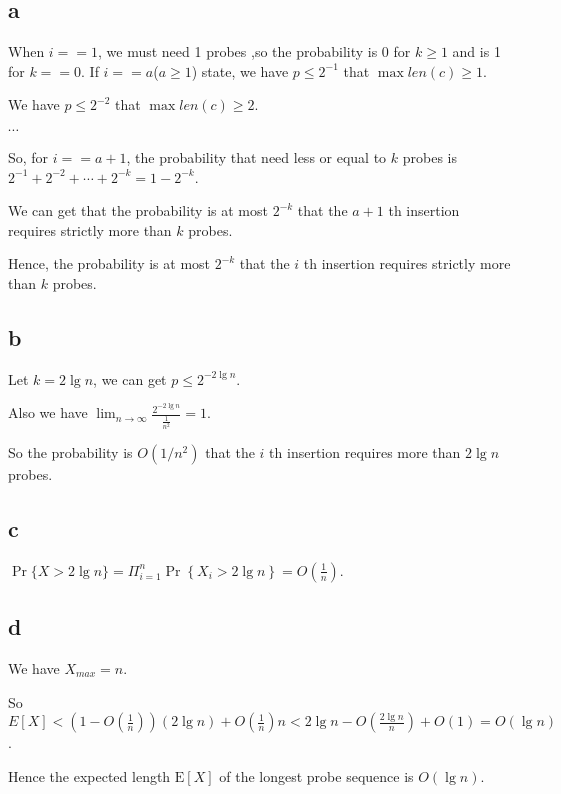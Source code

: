 \documentclass[11pt]{exam}
\begin{document}
\begin{solution}
    \subsection{a}
    When $i==1$, we must need 1 probes ,so the probability is 0 for $k \geq 1$ and is 1 for $k==0$.
    If $i==a$($a\geq 1$) state,
    we have $p\leq 2^{-1} $ that $\max len(c) \geq 1$.

    We have $p \leq 2^{-2}$ that $\max len(c) \geq 2$.

    $\cdots$

    So, for $i==a+1$,
    the probability that need less or equal to $k$ probes is $2^{-1}+2^{-2}+\cdots +2^{-k} = 1- 2^{-k}$.

    We can get that the probability is at most $2^{-k}$ that the $a+1$ th insertion requires strictly more than $k$ probes.

    Hence, the probability is at most $2^{-k}$ that the $i$ th insertion requires strictly more than $k$ probes.
    \subsection{b}
    Let $k=2 \lg n$, we can get $p \leq 2 ^{-2 \lg n}$.

    Also we have $\lim_{n \to \infty} \frac{2^{-2 \lg n}}{\frac{1}{n^2}}=1$.

    So the probability is $O\left(1 / n^{2}\right)$ that the $i$ th insertion requires more than $2 \lg n$ probes.
    \subsection{c}
    $\operatorname{Pr}\{X>2 \lg n\}=\Pi_{i=1}^{n} \operatorname{Pr}\left\{X_{i}>2 \lg n\right\} = O(\frac{1}{n}) $.

    \subsection{d}
    We have $X_{max} = n$.

    So $E[X] < (1-O(\frac{1}{n})) (2 \lg n) + O(\frac{1}{n}) n < 2 \lg n - O(\frac{2 \lg n }{n}) + O(1) =O(\lg n) $.

    Hence the expected length $\mathrm{E}[X]$ of the longest probe sequence is $O(\lg n)$.
\end{solution}
\end{document}
